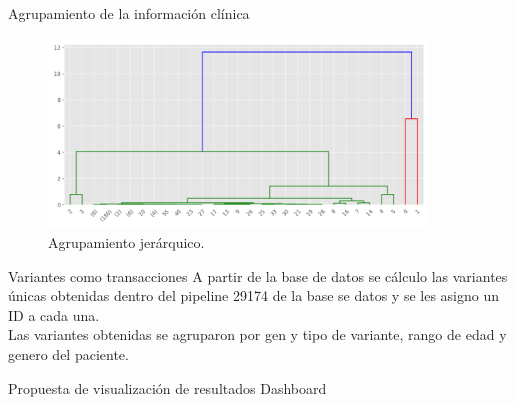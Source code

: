 \documentclass[xcolor=dvipsnames]{beamer}
\begin{document}
\begin{frame}{Agrupamiento de la información clínica}
 \begin{figure}[H]
		\centering
		\includegraphics[width=0.9\textwidth]{averagercortado.png}
		\centering
		\caption{Agrupamiento jerárquico.} \label{fig:idf}
	\end{figure}
\end{frame}

\begin{frame}{Variantes como transacciones}
\justifying 
A partir de la base de datos se cálculo las variantes únicas obtenidas dentro del pipeline 29174 de la base se datos y se les asigno un ID a cada una.  \\

Las variantes obtenidas se agruparon por gen y tipo de variante, rango de edad y genero del paciente.
    \begin{table}[H]
	\centering
\caption{Items y transacciones}
\label{tabla:items}
\end{table}

\end{frame}

\begin{frame}{Propuesta de visualización de resultados}
Dashboard
\end{frame}
\end{document}
